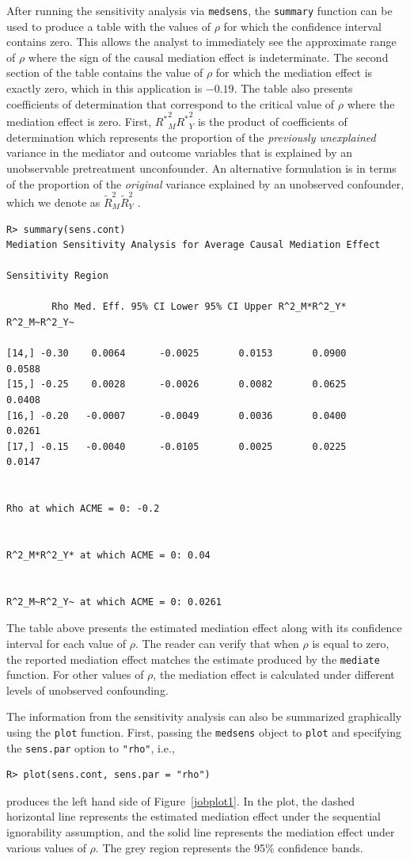 \documentclass[11pt,letterpaper]{article}
\theoremstyle{plain}
\begin{document}
After running the sensitivity analysis via \texttt{medsens}, the
\texttt{summary} function can be used to produce a table with the
values of $\rho$ for which the confidence interval contains zero.
This allows the analyst to immediately see the approximate range of
$\rho$ where the sign of the causal mediation effect is indeterminate.
The second section of the table contains the value of $\rho$ for which
the mediation effect is exactly zero, which in this application is
$-0.19$. The table also presents coefficients of determination that
correspond to the critical value of $\rho$ where the mediation effect
is zero. First, ${R^\ast}^2_M{R^\ast}^2_Y$ is the product of
coefficients of determination which represents the proportion of the
\emph{previously unexplained} variance in the mediator and outcome
variables that is explained by an unobservable pretreatment
unconfounder.  An alternative formulation is in terms of the
proportion of the \emph{original} variance explained by an unobserved
confounder, which we denote as $\widetilde{R}^2_M\widetilde{R}^2_Y$ .
\begin{verbatim}
R> summary(sens.cont)
Mediation Sensitivity Analysis for Average Causal Mediation Effect

Sensitivity Region

        Rho Med. Eff. 95% CI Lower 95% CI Upper R^2_M*R^2_Y* R^2_M~R^2_Y~
                
[14,] -0.30    0.0064      -0.0025       0.0153       0.0900       0.0588
[15,] -0.25    0.0028      -0.0026       0.0082       0.0625       0.0408
[16,] -0.20   -0.0007      -0.0049       0.0036       0.0400       0.0261
[17,] -0.15   -0.0040      -0.0105       0.0025       0.0225       0.0147


Rho at which ACME = 0: -0.2 


R^2_M*R^2_Y* at which ACME = 0: 0.04 


R^2_M~R^2_Y~ at which ACME = 0: 0.0261 
\end{verbatim}
The table above presents the estimated mediation effect along with its
confidence interval for each value of $\rho$.  The reader can verify
that when $\rho$ is equal to zero, the reported mediation effect
matches the estimate produced by the \texttt{mediate} function.  For
other values of $\rho$, the mediation effect is calculated under
different levels of unobserved confounding.

The information from the sensitivity analysis can also be summarized
graphically using the \texttt{plot} function.  First, passing the
\texttt{medsens} object to \texttt{plot} and specifying the
\texttt{sens.par} option to \texttt{"rho"}, i.e.,
\begin{verbatim}
R> plot(sens.cont, sens.par = "rho")
\end{verbatim}
produces the left hand side of Figure~\ref{jobplot1}.  In the plot, the dashed
horizontal line represents the estimated mediation effect under the sequential
ignorability assumption, and the solid line represents the mediation
effect under various values of $\rho$.  The grey region represents the
95\% confidence bands.
\end{document}
